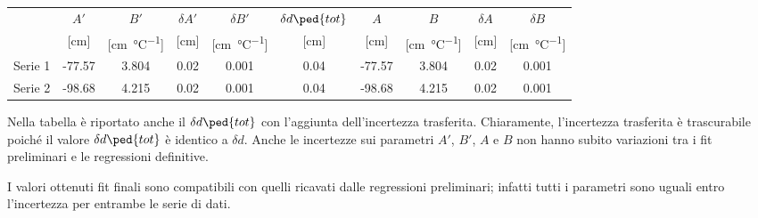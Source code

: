 \begin{center}
    \small
    \begin{tabular}{l c c c c c c c c c}
        \toprule
        & $A'$ & $B'$ & $\delta A'$ & $\delta B'$ &
        $\delta d\ped{tot}$ & $A$ & $B$ & $\delta A$ & $\delta B$ \\
        & [cm] & [\si{\centi\meter\per\celsius}] &  [cm] & [\si{\centi\meter\per\celsius}] &
        [cm] & [cm] & [\si{\centi\meter\per\celsius}] & [cm] & [\si{\centi\meter\per\celsius}] \\
        \midrule
        Serie 1 & -77.57 & 3.804 & 0.02 & 0.001 & 0.04 & -77.57 & 3.804 & 0.02 & 0.001 \\
        Serie 2  & -98.68 & 4.215 & 0.02 & 0.001 & 0.04 & -98.68 & 4.215 & 0.02 & 0.001 \\
        \bottomrule
    \end{tabular}
\end{center}

Nella tabella è riportato anche il $\delta d\ped{tot}$ con l'aggiunta dell'incertezza trasferita. Chiaramente, l'incertezza trasferita è
trascurabile poiché il valore $\delta d\ped{tot}$ è identico a $\delta d$. Anche le incertezze sui parametri $A'$, $B'$, $A$ e $B$
non hanno subito variazioni tra i fit preliminari e le regressioni definitive.

I valori ottenuti fit finali sono compatibili con quelli ricavati dalle regressioni preliminari; infatti tutti i parametri
sono uguali entro l'incertezza per entrambe le serie di dati.
